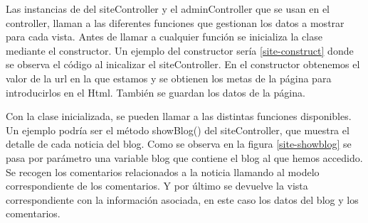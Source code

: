 \vspace{5 mm}

Las instancias de del siteController y el adminController que se usan en el controller, llaman a las diferentes funciones que gestionan los datos a mostrar para cada vista. Antes de llamar a cualquier función se inicializa la clase mediante el constructor. Un ejemplo del constructor sería \ref{site-construct} donde se observa el código al inicalizar el siteController. En el constructor obtenemos el valor de la url en la que estamos y se obtienen los metas de la página  para introducirlos en el Html. También se guardan los datos de la página.

\vspace{5 mm}

Con la clase inicializada, se pueden llamar a las distintas funciones disponibles. Un ejemplo podría ser el método showBlog() del siteController, que muestra el detalle de cada noticia del blog. Como se observa en la figura \ref{site-showblog} se pasa por parámetro una variable blog que contiene el blog al que hemos accedido. Se recogen los comentarios relacionados a la noticia llamando al modelo correspondiente de los comentarios. Y por último se devuelve la vista correspondiente con la información asociada, en este caso los datos del blog y los comentarios.





